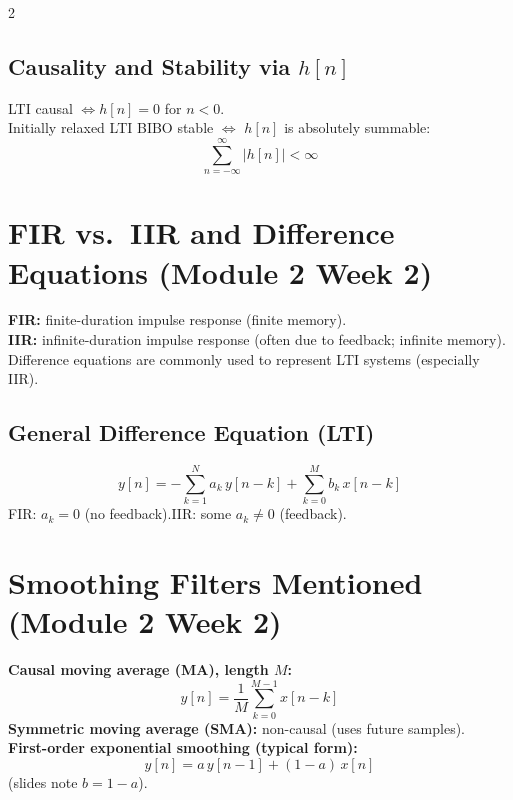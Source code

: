 \documentclass[10pt]{article}
\begin{document}
\begin{multicols}{2}
\subsection{Causality and Stability via $h[n]$}
LTI causal $\Leftrightarrow h[n]=0$ for $n<0$.\\
Initially relaxed LTI BIBO stable $\Leftrightarrow$ $h[n]$ is absolutely summable:
\[
\sum_{n=-\infty}^{\infty} |h[n]| < \infty
\]

\section{FIR vs.\ IIR and Difference Equations (Module 2 Week 2)}

\textbf{FIR:} finite-duration impulse response (finite memory).\\
\textbf{IIR:} infinite-duration impulse response (often due to feedback; infinite memory).\\
Difference equations are commonly used to represent LTI systems (especially IIR).

\subsection{General Difference Equation (LTI)}
\[
y[n]= -\sum_{k=1}^{N} a_k\,y[n-k] + \sum_{k=0}^{M} b_k\,x[n-k]
\]
FIR: $a_k=0$ (no feedback).\quad IIR: some $a_k\neq 0$ (feedback).

\section{Smoothing Filters Mentioned (Module 2 Week 2)}

\textbf{Causal moving average (MA), length $M$:}
\[
y[n] = \frac{1}{M}\sum_{k=0}^{M-1} x[n-k]
\]
\textbf{Symmetric moving average (SMA):} non-causal (uses future samples).\\
\textbf{First-order exponential smoothing (typical form):}
\[
y[n] = a\,y[n-1] + (1-a)\,x[n]
\]
(slides note $b=1-a$).

\end{multicols}
\end{document}
